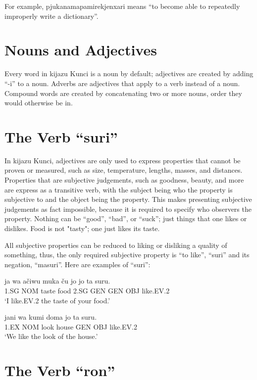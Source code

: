 \documentclass{clgrammar}
\begin{document}
For example, pjukanamapamirekjenxari means ``to become able to repeatedly improperly write a dictionary''.


\section{Nouns and Adjectives}
Every word in kijazu Kunci is a noun by default; adjectives are created by adding ``-i'' to a noun. Adverbs are adjectives that apply to a verb instead of a noun. Compound words are created by concatenating two or more nouns, order they would otherwise be in. 

\section{The Verb ``suri''} 

In kijazu Kunci, adjectives are only used to express properties that cannot be proven or measured, such as size, temperature, lengths, masses, and distances. Properties that are subjective judgements, such as goodness, beauty, and more are express as a transitive verb, with the subject being who the property is subjective to and the object being the property. This makes presenting subjective judgements as fact impossible, because it is required to specify who observers the property. Nothing can be ``good'', ``bad'', or ``suck''; just things that one likes or dislikes. Food is not "tasty"; one just likes its taste.

All subjective properties can be reduced to liking or disliking a quality of something, thus, the only required subjective property is ``to like'', ``suri'' and its negation, ``masuri''. Here are examples of ``suri'':

\begin{exe}
	\ex
	\gll ja wa ačiwu muka ču jo jo ta suru. \\
	1.SG NOM taste food 2.SG GEN GEN OBJ like.EV.2\\
	\trans `I like.EV.2 the taste of your food.'
\end{exe}

\begin{exe}
	\ex
	\gll jani wa kumi doma jo ta suru.\\
	1.EX NOM look house GEN OBJ like.EV.2 \\
	\trans `We like the look of the house.'
\end{exe}

\section{The Verb ``ron''}
\end{document}
